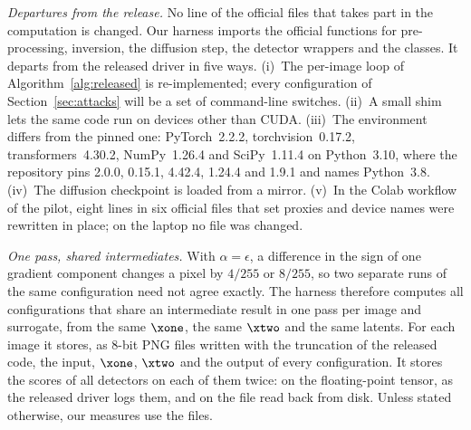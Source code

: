 \emph{Departures from the release.} No line of the official files that takes part in the
computation is changed. Our harness imports the official functions for pre-processing, inversion,
the diffusion step, the detector wrappers and the \CVAE classes. It departs from the released
driver in five ways. (i)~The per-image loop of Algorithm~\ref{alg:released} is re-implemented;
every configuration of Section~\ref{sec:attacks} will be a set of command-line switches.
(ii)~A small shim lets the same code run on devices other than CUDA. (iii)~The environment differs
from the pinned one: PyTorch~2.2.2, torchvision~0.17.2, transformers~4.30.2, NumPy~1.26.4 and
SciPy~1.11.4 on Python~3.10, where the repository pins 2.0.0, 0.15.1, 4.42.4, 1.24.4 and 1.9.1 and
names Python~3.8. (iv)~The diffusion checkpoint is loaded from a mirror. (v)~In the Colab workflow
of the pilot, eight lines in six official files that set proxies and device names were rewritten
in place; on the laptop no file was changed. 

\emph{One pass, shared intermediates.} With $\alpha=\epsilon$, a difference in the sign of one
gradient component changes a pixel by $4/255$ or $8/255$, so two separate runs of the same
configuration need not agree exactly. The harness therefore computes all configurations that share
an intermediate result in one pass per image and surrogate, from the same $\xone$, the same
$\xtwo$ and the same latents. For each image it stores, as 8-bit PNG files written with the
truncation of the released code, the input, $\xone$, $\xtwo$ and the output of every
configuration. It stores the scores of all detectors on each of them twice: on the floating-point
tensor, as the released driver logs them, and on the file read back from disk. Unless stated
otherwise, our measures use the files.

